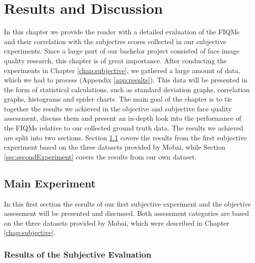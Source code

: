 \chapter{Results and Discussion}
\label{chap:Results}
In this chapter we provide the reader with a detailed evaluation of the FIQMs and their correlation with the subjective scores collected in our subjective experiments. Since a large part of our bachelor project consisted of face image quality research, this chapter is of great importance. After conducting the experiments in Chapter \ref{chap:subjective}, we gathered a large amount of data, which we had to process (Appendix \ref{app:results}). This data will be presented in the form of statistical calculations, such as standard deviation graphs, correlation graphs, histograms and spider charts. The main goal of the chapter is to tie together the results we achieved in the objective and subjective face quality assessment, discuss them and present an in-depth look into the performance of the FIQMs relative to our collected ground truth data. The results we achieved are split into two sections. Section \ref{sec:mainExperiment} covers the results from the first subjective experiment based on the three datasets provided by Mobai, while Section \ref{sec:secondExperiment} covers the results from our own dataset. 

\section{Main Experiment}
\label{sec:mainExperiment}
In this first section the results of our first subjective experiment and the objective assessment will be presented and discussed. Both assessment categories are based on the three datasets provided by Mobai, which were described in Chapter \ref{chap:subjective}. 


\subsection{Results of the Subjective Evaluation}
\label{sec:SubAssessment}

